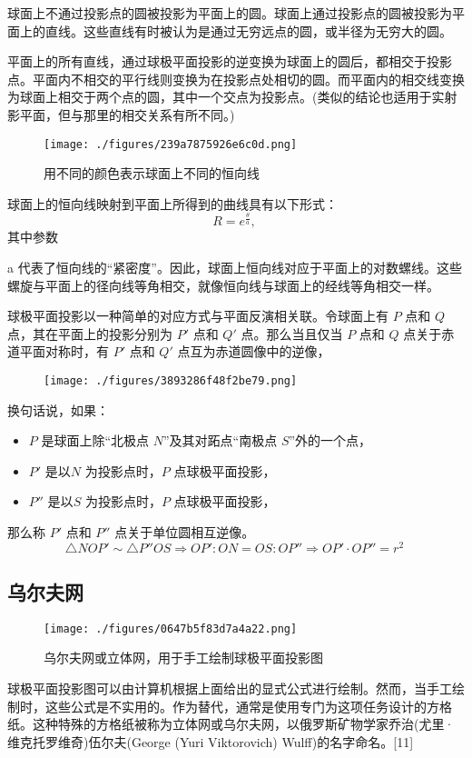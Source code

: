 球面上不通过投影点的圆被投影为平面上的圆。球面上通过投影点的圆被投影为平面上的直线。这些直线有时被认为是通过无穷远点的圆，或半径为无穷大的圆。

平面上的所有直线，通过球极平面投影的逆变换为球面上的圆后，都相交于投影点。平面内不相交的平行线则变换为在投影点处相切的圆。而平面内的相交线变换为球面上相交于两个点的圆，其中一个交点为投影点。(类似的结论也适用于实射影平面，但与那里的相交关系有所不同。)
\begin{figure}[ht]
\centering
\texttt{[image: ./figures/239a7875926e6c0d.png]}
\caption{用不同的颜色表示球面上不同的恒向线} \label{fig_QJPMTY_8}
\end{figure}
球面上的恒向线映射到平面上所得到的曲线具有以下形式：
$$R = e^{\frac{\theta}{a}},~$$
其中参数

a 代表了恒向线的“紧密度”。因此，球面上恒向线对应于平面上的对数螺线。这些螺旋与平面上的径向线等角相交，就像恒向线与球面上的经线等角相交一样。

球极平面投影以一种简单的对应方式与平面反演相关联。令球面上有 \(P\) 点和 \(Q\) 点，其在平面上的投影分别为 \(P'\) 点和 \(Q'\) 点。那么当且仅当 \(P\) 点和 \(Q\) 点关于赤道平面对称时，有 \(P'\) 点和 \(Q'\) 点互为赤道圆像中的逆像，
\begin{figure}[ht]
\centering
\texttt{[image: ./figures/3893286f48f2be79.png]}
\caption{} \label{fig_QJPMTY_9}
\end{figure}
换句话说，如果：
\begin{itemize}
\item \(P\) 是球面上除“北极点 \(N\)”及其对跖点“南极点 \(S\)”外的一个点，
\item \(P'\)  是以\(N\) 为投影点时，\(P\) 点球极平面投影，
\item \(P''\) 是以\(S\) 为投影点时，\(P\) 点球极平面投影，
\end{itemize}
那么称 \(P'\) 点和 \(P''\) 点关于单位圆相互逆像。
$$\triangle NOP' \sim \triangle P''OS \Longrightarrow OP' : ON = OS : OP'' \Longrightarrow OP' \cdot OP'' = r^2~$$

\subsection{乌尔夫网}
\begin{figure}[ht]
\centering
\texttt{[image: ./figures/0647b5f83d7a4a22.png]}
\caption{乌尔夫网或立体网，用于手工绘制球极平面投影图} \label{fig_QJPMTY_10}
\end{figure}
球极平面投影图可以由计算机根据上面给出的显式公式进行绘制。然而，当手工绘制时，这些公式是不实用的。作为替代，通常是使用专门为这项任务设计的方格纸。这种特殊的方格纸被称为立体网或乌尔夫网，以俄罗斯矿物学家乔治(尤里·维克托罗维奇)伍尔夫(George (Yuri Viktorovich) Wulff)的名字命名。[11]

